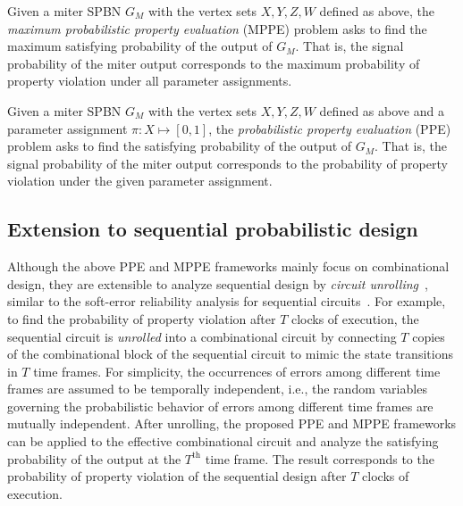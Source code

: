 \begin{definition}
    Given a miter SPBN $G_M$ with the vertex sets $X,Y,Z,W$ defined as above,
    the \textit{maximum probabilistic property evaluation} (MPPE) problem asks to find the maximum satisfying probability of the output of $G_M$.
    That is,
    the signal probability of the miter output corresponds to the maximum probability of property violation under all parameter assignments.
\end{definition}

\begin{definition}
    Given a miter SPBN $G_M$ with the vertex sets $X,Y,Z,W$ defined as above and a parameter assignment $\pi:X\mapsto[0,1]$,
    the \textit{probabilistic property evaluation} (PPE) problem asks to find the satisfying probability of the output of $G_M$.
    That is,
    the signal probability of the miter output corresponds to the probability of property violation under the given parameter assignment.
\end{definition}

\subsection{Extension to sequential probabilistic design}
Although the above PPE and MPPE frameworks mainly focus on combinational design,
they are extensible to analyze sequential design by \textit{circuit unrolling}~\cite{Clarke2001},
similar to the soft-error reliability analysis for sequential circuits~\cite{Miskov-Zivanov2008}.
For example,
to find the probability of property violation after $T$ clocks of execution,
the sequential circuit is \textit{unrolled} into a combinational circuit by connecting $T$ copies of the combinational block of the sequential circuit to mimic the state transitions in $T$ time frames.
For simplicity,
the occurrences of errors among different time frames are assumed to be temporally independent,
i.e., the random variables governing the probabilistic behavior of errors among different time frames are mutually independent.
After unrolling,
the proposed PPE and MPPE frameworks can be applied to the effective combinational circuit and
analyze the satisfying probability of the output at the $T^\mathrm{th}$ time frame.
The result corresponds to the probability of property violation of the sequential design after $T$ clocks of execution.